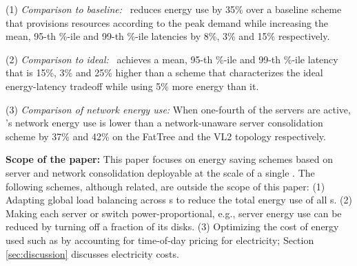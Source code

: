 (1) \emph{Comparison to baseline:}  \shrink\ reduces energy use by 35\% over a baseline scheme that provisions resources according to the peak demand while increasing the mean, 95-th \%-ile and 99-th \%-ile latencies by 8\%, 3\% and 15\% respectively. 

(2) \emph{Comparison to ideal:}  \shrink\ achieves a mean, 95-th \%-ile and 99-th \%-ile latency that is 15\%, 3\% and 25\% higher than a scheme that characterizes the ideal energy-latency tradeoff while using 5\% more energy than it.

(3) \emph{Comparison of network energy use:} When one-fourth of the servers are active, \shrink's network energy use is lower than a network-unaware server consolidation scheme by 37\% and 42\% on the FatTree \cite{fattree} and the VL2 \cite{vl2} topology respectively.

\textbf{Scope of the paper:} This paper focuses on energy saving schemes based on server and network consolidation deployable at the scale of a single \cdc. The following schemes, although related, are outside the scope of this paper: (1) Adapting global load balancing across \cdc s to reduce the total energy use of all \cdc s. (2) Making each server or switch power-proportional, e.g., server energy use can be reduced by turning off a fraction of its disks. (3) Optimizing the cost of energy used such as by accounting for time-of-day pricing for electricity; Section \ref{sec:discussion} discusses electricity costs.





